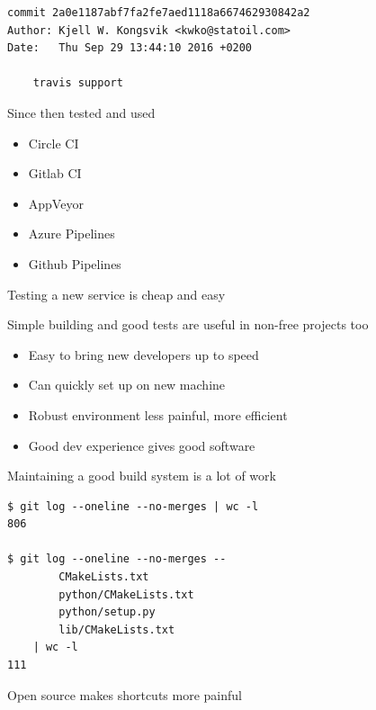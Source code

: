 \documentclass[pdf]{beamer}
\begin{document}
\begin{frame}[fragile]
    \begin{verbatim}
commit 2a0e1187abf7fa2fe7aed1118a667462930842a2
Author: Kjell W. Kongsvik <kwko@statoil.com>
Date:   Thu Sep 29 13:44:10 2016 +0200

    travis support
    \end{verbatim}
\end{frame}

\begin{frame}
    Since then tested and used
    \begin{itemize}
        \item Circle CI
        \item Gitlab CI
        \item AppVeyor
        \item Azure Pipelines
        \item Github Pipelines
    \end{itemize}

    Testing a new service is cheap and easy
\end{frame}

\begin{frame}
    Simple building and good tests are useful in non-free projects too

    \begin{itemize}
        \item Easy to bring new developers up to speed
        \item Can quickly set up on new machine
        \item Robust environment less painful, more efficient
        \item Good dev experience gives good software
    \end{itemize}

    Maintaining a good build system is a lot of work
\end{frame}

\begin{frame}[fragile]
    \begin{verbatim}
$ git log --oneline --no-merges | wc -l
806

$ git log --oneline --no-merges --
        CMakeLists.txt
        python/CMakeLists.txt
        python/setup.py
        lib/CMakeLists.txt
    | wc -l
111
    \end{verbatim}
\end{frame}

\begin{frame}
    Open source makes shortcuts more painful
\end{frame}
\end{document}
